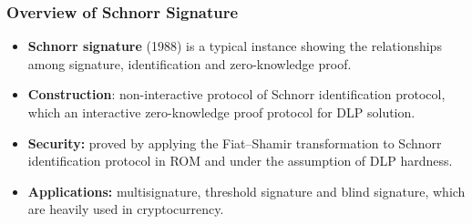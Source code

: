 \begin{frame}\frametitle{Overview of Schnorr Signature}
\begin{itemize}
	\item \textbf{Schnorr signature} (1988) is a typical instance showing the relationships among signature, identification and zero-knowledge proof.
	\item \textbf{Construction}: non-interactive protocol of Schnorr identification protocol, which an interactive zero-knowledge proof protocol for DLP solution.
	\item \textbf{Security:} proved by applying the Fiat–Shamir transformation to Schnorr identification protocol in ROM and under the assumption of DLP hardness.
	\item \textbf{Applications:} multisignature, threshold signature and blind signature, which are heavily used in cryptocurrency.
\end{itemize}	

\end{frame}
% 


